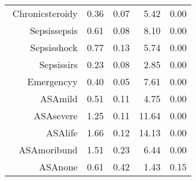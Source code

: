 \begin{tabular}{rrrrr}
$$  Chronic\-steroid\-y & 0.36 & 0.07 & 5.42 & 0.00 \\ 
  Sepsis\-sepsis & 0.61 & 0.08 & 8.10 & 0.00 \\ 
  Sepsis\-shock & 0.77 & 0.13 & 5.74 & 0.00 \\ 
  Sepsis\-sirs & 0.23 & 0.08 & 2.85 & 0.00 \\ 
  Emergency\-y & 0.40 & 0.05 & 7.61 & 0.00 \\ 
  ASA\-mild & 0.51 & 0.11 & 4.75 & 0.00 \\ 
  ASA\-severe & 1.25 & 0.11 & 11.64 & 0.00 \\ 
  ASA\-life & 1.66 & 0.12 & 14.13 & 0.00 \\ 
  ASA\-moribund & 1.51 & 0.23 & 6.44 & 0.00 \\ 
  ASA\-none & 0.61 & 0.42 & 1.43 & 0.15 \\ 
   \hline
\end{tabular}

